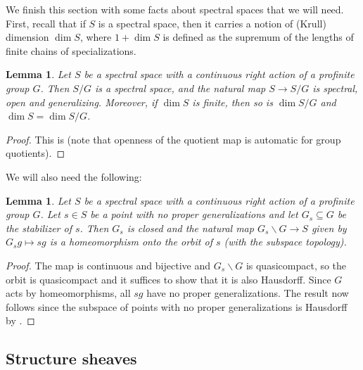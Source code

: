 \documentclass{amsart}
\newtheorem{lemma}[subsubsection]{Lemma}
\theoremstyle{remark}
\numberwithin{equation}{subsection}
\renewcommand{\(}{\left(}
\renewcommand{\)}{\right)}
\begin{document}
We finish this section with some facts about spectral spaces that we will need. First, recall that if $S$ is a spectral space, then it carries a notion of (Krull) dimension $\dim S$, where $1+\dim S$ is defined as the supremum of the lengths of finite chains of specializations. 

\begin{lemma}\label{spectral quotient}
Let $S$ be a spectral space with a continuous right action of a profinite group $G$. Then $S/G$ is a spectral space, and the natural map $S \to S/G$ is spectral, open and generalizing. Moreover, if $\dim S$ is finite, then so is $\dim S/G$ and $\dim S = \dim S/G$.
\end{lemma}

\begin{proof}
This is \cite[Lemma 3.2.3]{extensions} (note that openness of the quotient map is automatic for group quotients).
\end{proof}

We will also need the following:

\begin{lemma}\label{homeomorphism onto orbit}
Let $S$ be a spectral space with a continuous right action of a profinite group $G$. Let $s\in S$ be a point with no proper generalizations and let $G_{s} \subseteq G$ be the stabilizer of $s$. Then $G_{s}$ is closed and the natural map $G_{s}\backslash G \to S$ given by $G_{s}g \mapsto sg$ is a homeomorphism onto the orbit of $s$ (with the subspace topology).
\end{lemma}

\begin{proof}
The map is continuous and bijective and $G_{s}\backslash G$ is quasicompact, so the orbit is quasicompact and it suffices to show that it is also Hausdorff. Since $G$ acts by homeomorphisms, all $sg$ have no proper generalizations. The result now follows since the subspace of points with no proper generalizations is Hausdorff by \cite[Tag 0904]{stacks-project}.
\end{proof}

\subsection{Structure sheaves}\label{structure sheaves}
\end{document}
